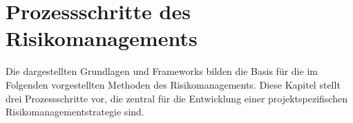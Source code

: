 \chapter{Prozessschritte des Risikomanagements} \label{sec:methoden}

Die dargestellten Grundlagen und Frameworks bilden die Basis für die im Folgenden vorgestellten Methoden des Risikomanagements.
Diese Kapitel stellt drei Prozessschritte vor, die zentral für die Entwicklung einer projektspezifischen Risikomanagementstrategie sind.




